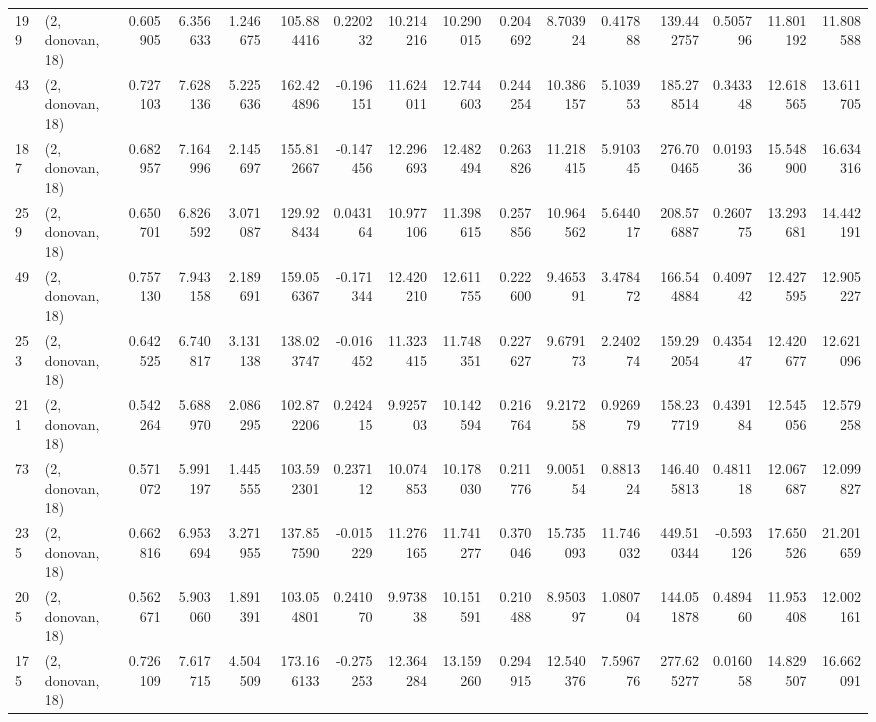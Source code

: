 \begin{tabular}{llrrrrrrrrrrrrrr}
199 &  (2, donovan, 18) &   0.605905 &   6.356633 &   1.246675 &   105.884416 &   0.220232 &  10.214216 &  10.290015 &  0.204692 &   8.703924 &   0.417888 &    139.442757 &    0.505796 &   11.801192 &   11.808588 \\
43  &  (2, donovan, 18) &   0.727103 &   7.628136 &   5.225636 &   162.424896 &  -0.196151 &  11.624011 &  12.744603 &  0.244254 &  10.386157 &   5.103953 &    185.278514 &    0.343348 &   12.618565 &   13.611705 \\
187 &  (2, donovan, 18) &   0.682957 &   7.164996 &   2.145697 &   155.812667 &  -0.147456 &  12.296693 &  12.482494 &  0.263826 &  11.218415 &   5.910345 &    276.700465 &    0.019336 &   15.548900 &   16.634316 \\
259 &  (2, donovan, 18) &   0.650701 &   6.826592 &   3.071087 &   129.928434 &   0.043164 &  10.977106 &  11.398615 &  0.257856 &  10.964562 &   5.644017 &    208.576887 &    0.260775 &   13.293681 &   14.442191 \\
49  &  (2, donovan, 18) &   0.757130 &   7.943158 &   2.189691 &   159.056367 &  -0.171344 &  12.420210 &  12.611755 &  0.222600 &   9.465391 &   3.478472 &    166.544884 &    0.409742 &   12.427595 &   12.905227 \\
253 &  (2, donovan, 18) &   0.642525 &   6.740817 &   3.131138 &   138.023747 &  -0.016452 &  11.323415 &  11.748351 &  0.227627 &   9.679173 &   2.240274 &    159.292054 &    0.435447 &   12.420677 &   12.621096 \\
211 &  (2, donovan, 18) &   0.542264 &   5.688970 &   2.086295 &   102.872206 &   0.242415 &   9.925703 &  10.142594 &  0.216764 &   9.217258 &   0.926979 &    158.237719 &    0.439184 &   12.545056 &   12.579258 \\
73  &  (2, donovan, 18) &   0.571072 &   5.991197 &   1.445555 &   103.592301 &   0.237112 &  10.074853 &  10.178030 &  0.211776 &   9.005154 &   0.881324 &    146.405813 &    0.481118 &   12.067687 &   12.099827 \\
235 &  (2, donovan, 18) &   0.662816 &   6.953694 &   3.271955 &   137.857590 &  -0.015229 &  11.276165 &  11.741277 &  0.370046 &  15.735093 &  11.746032 &    449.510344 &   -0.593126 &   17.650526 &   21.201659 \\
205 &  (2, donovan, 18) &   0.562671 &   5.903060 &   1.891391 &   103.054801 &   0.241070 &   9.973838 &  10.151591 &  0.210488 &   8.950397 &   1.080704 &    144.051878 &    0.489460 &   11.953408 &   12.002161 \\
175 &  (2, donovan, 18) &   0.726109 &   7.617715 &   4.504509 &   173.166133 &  -0.275253 &  12.364284 &  13.159260 &  0.294915 &  12.540376 &   7.596776 &    277.625277 &    0.016058 &   14.829507 &   16.662091 \\

\end{tabular}
